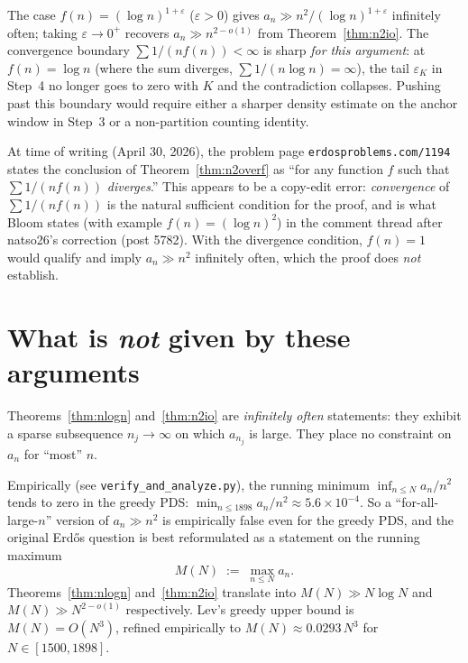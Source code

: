 \documentclass[11pt]{article}
\begin{document}
\begin{remark}
The case $f(n) = (\log n)^{1+\varepsilon}$ ($\varepsilon > 0$) gives
$a_n \gg n^2/(\log n)^{1+\varepsilon}$ infinitely often; taking
$\varepsilon \to 0^+$ recovers $a_n \gg n^{2-o(1)}$ from
Theorem~\ref{thm:n2io}. The convergence boundary
$\sum 1/(n f(n)) < \infty$ is sharp \emph{for this argument}: at
$f(n) = \log n$ (where the sum diverges, $\sum 1/(n \log n) = \infty$),
the tail $\varepsilon_K$ in Step~4 no longer goes to zero with $K$ and
the contradiction collapses. Pushing past this boundary would require
either a sharper density estimate on the anchor window in Step~3 or a
non-partition counting identity.
\end{remark}

\begin{remark}
\label{rem:typo}
At time of writing (April 30, 2026), the problem page
\texttt{erdosproblems.com/1194} states the conclusion of
Theorem~\ref{thm:n2overf} as ``for any function $f$ such that
$\sum 1/(n f(n))$ \emph{diverges}.'' This appears to be a copy-edit
error: \emph{convergence} of $\sum 1/(nf(n))$ is the natural sufficient
condition for the proof, and is what Bloom states (with example
$f(n) = (\log n)^2$) in the comment thread after natso26's correction
(post 5782). With the divergence condition, $f(n) = 1$ would qualify and
imply $a_n \gg n^2$ infinitely often, which the proof does \emph{not}
establish.
\end{remark}

\section{What is \emph{not} given by these arguments}\label{sec:caveats}

Theorems~\ref{thm:nlogn} and~\ref{thm:n2io} are \emph{infinitely often}
statements: they exhibit a sparse subsequence $n_j \to \infty$ on which
$a_{n_j}$ is large. They place no constraint on $a_n$ for ``most'' $n$.

Empirically (see \texttt{verify\_and\_analyze.py}), the running minimum
$\inf_{n \leq N} a_n / n^2$ tends to zero in the greedy PDS:
$\min_{n \leq 1898} a_n/n^2 \approx 5.6 \times 10^{-4}$. So a
``for-all-large-$n$'' version of $a_n \gg n^2$ is empirically false even
for the greedy PDS, and the original Erd\H{o}s question is best
reformulated as a statement on the running maximum
\[
   M(N) \;:=\; \max_{n \leq N} a_n.
\]
Theorems~\ref{thm:nlogn} and~\ref{thm:n2io} translate into
$M(N) \gg N \log N$ and $M(N) \gg N^{2-o(1)}$ respectively. Lev's
greedy upper bound is $M(N) = O(N^3)$, refined empirically to
$M(N) \approx 0.0293\, N^3$ for $N \in [1500, 1898]$.
\end{document}
